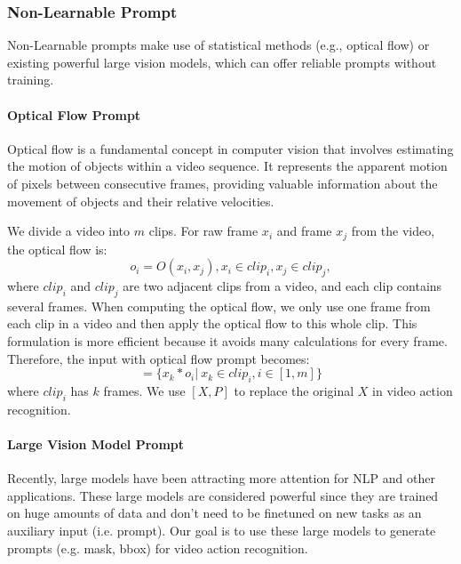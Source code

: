 \documentclass[letterpaper, 10 pt, conference]{ieeeconf}
\begin{document}
\subsubsection{Non-Learnable Prompt}
Non-Learnable prompts make use of statistical methods (e.g., optical flow) or existing powerful large vision models, which can offer reliable prompts without training. 
\paragraph{Optical Flow Prompt}
Optical flow is a fundamental concept in computer vision that involves estimating the motion of objects within a video sequence. It represents the apparent motion of pixels between consecutive frames, providing valuable information about the movement of objects and their relative velocities. 

We divide a video into $m$ clips. For raw frame $x_i$ and frame $x_j$ from the video, the optical flow is:
 \begin{equation}
o_{i} = O(x_i, x_j), x_i\in clip_i, x_j\in clip_j,
 \end{equation}
where $clip_i$ and $clip_j$ are two adjacent clips from a video, and each clip contains several frames. When computing the optical flow, we only use one frame from each clip in a video and then apply the optical flow to this whole clip. This formulation is more efficient because it avoids many calculations for every frame. Therefore, the input with optical flow prompt becomes:
 \begin{equation}
[X,P] = \{x_k*o_{i} | \: x_k \in clip_i, i\in[1,m]\}
 \end{equation}
 where $clip_i$ has $k$ frames. We use $[X,P]$ to replace the original $X$ in video action recognition. 
 
\paragraph{Large Vision Model Prompt}

Recently, large models have been attracting more attention for NLP and other applications.  These large models are considered powerful since they are trained on huge amounts of data and don't need to be finetuned on new tasks as an auxiliary input (i.e. prompt). Our goal is to use these large models to generate prompts (e.g. mask, bbox) for video action recognition. 
\end{document}
